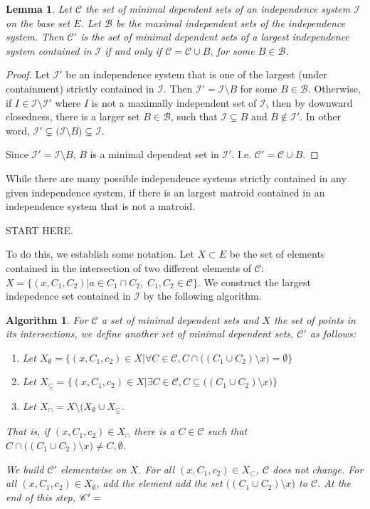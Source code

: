 \documentclass[11pt]{article}
\newcommand{\sI}{\mathscr{I}}
\newcommand{\cI}{\mathcal{I}}
\newcommand{\sC}{\mathscr{C}}
\newcommand{\sB}{\mathscr{B}}
\newtheorem{lem}[thm]{Lemma}
\newtheorem{alg}[thm]{Algorithm}
\theoremstyle{remark}
\theoremstyle{definition}
\begin{document}
\begin{lem}
Let $\sC$ the set of minimal dependent sets of an independence system $\sI$ on the base set $E$. Let $\sB$ be the maximal independent sets of the independence system. Then $\sC'$ is the set of minimal dependent sets of a largest independence system contained in $\sI$ if and only if $\sC = \sC \cup B$, for some $B \in \sB$.
\end{lem}
\begin{proof}
Let $\sI'$ be an independence system that is one of the largest (under containment) strictly contained in $\sI$. Then $\sI' = \sI \setminus B$ for some $B \in \sB$. Otherwise, if $I \in \sI \setminus \sI'$ where $I$ is not a maximally independent set of $\sI$, then by downward closedness, there is a larger set $B \in \sB$, such that $\sI \subsetneq B$ and $B \not \in \sI'$. In other word, $\sI' \subsetneq \big(\sI \setminus B) \subsetneq \sI$. 

Since $\sI' = \sI \setminus B$, $B$ is a minimal dependent set in $\sI'$. I.e. $\sC' = \sC \cup B$.
\end{proof}

While there are many possible independence systems strictly contained in any given independence system, if there is an largest matroid contained in an independence system that is not a matroid. 

START HERE.

To do this, we establish some notation. Let $X \subset E$ be the set of elements contained in the intersection of two different elements of $\sC$: $X = \{ (x, C_1, C_2 )| a \in C_1 \cap C_2, \; C_1, C_2 \in \sC\}$. We construct the largest indepedence set contained in $\cI$ by the following algorithm.

\begin{alg}
    For $\sC$ a set of minimal dependent sets and $X$ the set of points in its intersections, we define another set of minimal dependent sets, $\sC'$ as follows:
\begin{enumerate}
    \item Let $X_\emptyset = \{(x, C_1, c_2) \in X | \forall C \in \sC , C \cap \big((C_1 \cup C_2) \setminus x\big) = \emptyset\}$ 
    \item Let $X_\subseteq = \{(x, C_1, c_2) \in X | \exists C \in \sC , C \subseteq \big((C_1 \cup C_2) \setminus x\big)\}$
    \item Let $X_\cap = X \setminus \big(X_\emptyset \cup X_\subsetneq$. 
    \end{enumerate}
That is, if $(x, C_1, c_2) \in X_\cap$ there is a $C \in \sC$ such that $C \cap \big((C_1 \cup C_2) \setminus x\big) \neq C, \emptyset$.

We build $\sC'$ elementwise on $X$. For all $(x, C_1, c_2) \in X_\subset$, $\sC$ does not change. For all $(x, C_1, c_2) \in X_\emptyset$, add the element add the set $\big((C_1 \cup C_2) \setminus x\big)$ to $\sC$. At the end of this step, $\sC' = \sc$ 
\end{alg}
\end{document}
